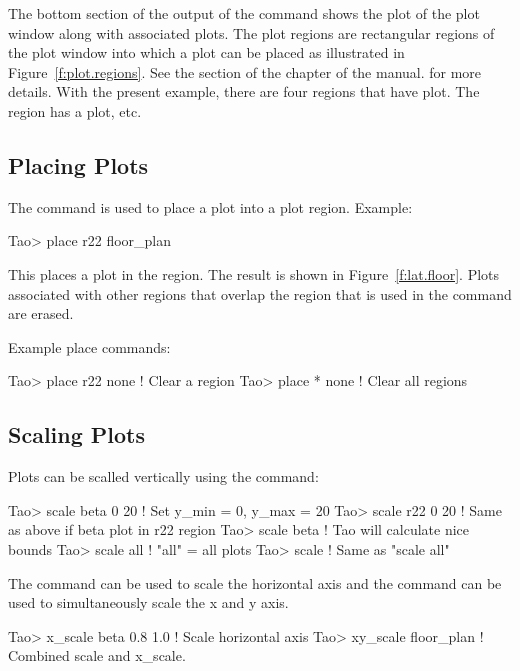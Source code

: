 \documentclass{hitec}
\begin{document}
The bottom section of the output of the  command shows the plot  of the
plot window along with associated plots. The plot regions are rectangular regions of the plot window
into which a plot can be placed as illustrated in Figure~\ref{f:plot.regions}.  See the
 section of the  chapter of the \tao manual. for
more details. With the present example, there are four regions that have plot. The  region
has a  plot, etc.


\subsection{Placing Plots}

The  command is used to place a  plot into a plot region. Example:
{\small
\begin{code}
Tao> place r22 floor_plan
\end{code}}
This places a  plot in the  region.
The result is shown in Figure~\ref{f:lat.floor}. Plots associated with other regions
that overlap the region that is used in the  command are erased. 

Example place commands:
{\small
\begin{code}
Tao> place r22 none    ! Clear a region
Tao> place * none      ! Clear all regions
\end{code}}

\subsection{Scaling Plots}

Plots can be scalled vertically using the  command:
{\small
\begin{code}
Tao> scale beta 0 20  ! Set y_min = 0, y_max = 20
Tao> scale r22 0 20   ! Same as above if beta plot in r22 region
Tao> scale beta       ! Tao will calculate nice bounds
Tao> scale all        ! "all" = all plots
Tao> scale            ! Same as "scale all"
\end{code}}

The  command can be used to scale the horizontal axis and
the  command can be used to simultaneously scale the x and y axis.
{\small
\begin{code}
Tao> x_scale beta 0.8 1.0   ! Scale horizontal axis
Tao> xy_scale floor_plan    ! Combined scale and x_scale.
\end{code}}
\end{document}
